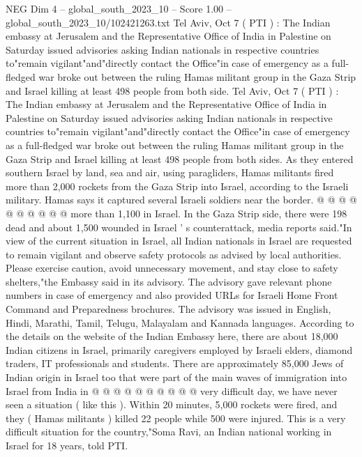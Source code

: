 \begin{textsample}{NEG Dim 4 – global\_south\_2023\_10 – Score 1.00 – global\_south\_2023\_10/102421263.txt}  \label{ex:f4_neg_033}
Tel Aviv, Oct 7 ( PTI ) : The Indian embassy at Jerusalem and the Representative Office of India in Palestine on Saturday issued advisories asking Indian nationals in respective countries to"remain vigilant"and"directly contact the Office"in case of emergency as a full-fledged war broke out between the ruling Hamas militant group in the Gaza Strip and Israel killing at least 498 people from both side.
Tel Aviv, Oct 7 ( PTI ) : The Indian embassy at Jerusalem and the Representative Office of India in Palestine on Saturday issued advisories asking Indian nationals in respective countries to"remain vigilant"and"directly contact the Office"in case of emergency as a full-fledged war broke out between the ruling Hamas militant group in the Gaza Strip and Israel killing at least 498 people from both sides.
As they entered southern Israel by land, sea and air, using paragliders, Hamas militants fired more than 2,000 rockets from the Gaza Strip into Israel, according to the Israeli military.
Hamas says it captured several Israeli soldiers near the border. @ @ @ @ @ @ @ @ @ @ more than 1,100 in Israel.
In the Gaza Strip side, there were 198 dead and about 1,500 wounded in Israel ' s counterattack, media reports said."In view of the current situation in Israel, all Indian nationals in Israel are requested to remain vigilant and observe safety protocols as advised by local authorities.
Please exercise caution, avoid unnecessary movement, and stay close to safety shelters,"the Embassy said in its advisory.
The advisory gave relevant phone numbers in case of emergency and also provided URLs for Israeli Home Front Command and Preparedness brochures.
The advisory was issued in English, Hindi, Marathi, Tamil, Telugu, Malayalam and Kannada languages.
According to the details on the website of the Indian Embassy here, there are about 18,000 Indian citizens in Israel, primarily caregivers employed by Israeli elders, diamond traders, IT professionals and students.
There are approximately 85,000 Jews of Indian origin in Israel too that were part of the main waves of immigration into Israel from India in @ @ @ @ @ @ @ @ @ @ very difficult day, we have never seen a situation ( like this ).
Within 20 minutes, 5,000 rockets were fired, and they ( Hamas militants ) killed 22 people while 500 were injured.
This is a very difficult situation for the country,"Soma Ravi, an Indian national working in Israel for 18 years, told PTI.

\end{textsample}
